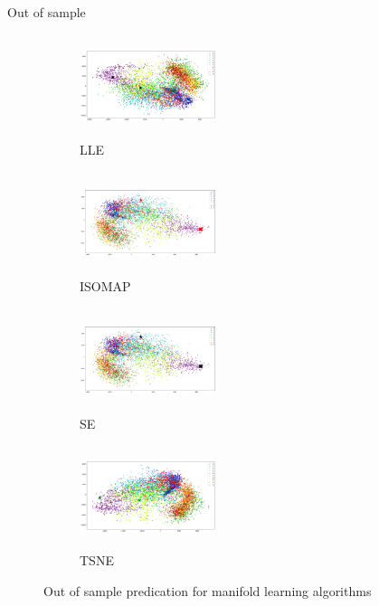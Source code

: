 \documentclass{beamer}
\theoremstyle{plain}
\theoremstyle{definition}
\theoremstyle{plain}
\theoremstyle{plain}
\begin{document}
\begin{frame}{Out of sample}

\begin{figure}[t!] %
\begin{subfigure}{0.32\textwidth}
\includegraphics[height=3cm,width=4cm]{./Figures/LLE_OS.png}
\caption{LLE} 
\end{subfigure}\hspace*{\fill}
\begin{subfigure}{0.32\textwidth}
\includegraphics[height=3cm,width=4cm]{./Figures/ISO_OS.png}
\caption{ISOMAP} 
\end{subfigure}

\medskip
\begin{subfigure}{0.32\textwidth}
\includegraphics[height=3cm,width=4cm]{./Figures/SE_OS.png}
\caption{SE}
\end{subfigure}\hspace*{\fill}
\begin{subfigure}{0.32\textwidth}
\includegraphics[height=3cm,width=4cm]{./Figures/TSNE_OS.png}
\caption{TSNE} 
\end{subfigure}

\caption{Out of sample predication for manifold learning algorithms} \label{OSML}
\end{figure}
\end{frame}
\end{document}
